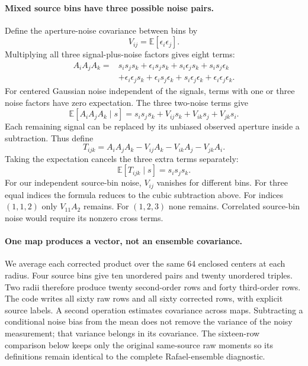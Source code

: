 \documentclass[11pt]{article}
\newcommand{\E}{\mathbb E}
\begin{document}
\paragraph{Mixed source bins have three possible noise pairs.}
Define the aperture-noise covariance between bins by
\begin{equation}
 V_{ij}=\E[\epsilon_i\epsilon_j].
\end{equation}
Multiplying all three signal-plus-noise factors gives eight terms:
\begin{align}
 A_iA_jA_k={}&s_is_js_k
 +\epsilon_i s_js_k+s_i\epsilon_j s_k+s_is_j\epsilon_k\nonumber\\
 &+\epsilon_i\epsilon_j s_k
  +\epsilon_i s_j\epsilon_k
  +s_i\epsilon_j\epsilon_k
  +\epsilon_i\epsilon_j\epsilon_k.
\end{align}
For centered Gaussian noise independent of the signals, terms with one or
three noise factors have zero expectation. The three two-noise terms give
\begin{equation}
 \E[A_iA_jA_k\mid s]=s_is_js_k+V_{ij}s_k+V_{ik}s_j+V_{jk}s_i.
\end{equation}
Each remaining signal can be replaced by its unbiased observed aperture
inside a subtraction. Thus define
\begin{equation}
 T_{ijk}=A_iA_jA_k-V_{ij}A_k-V_{ik}A_j-V_{jk}A_i.
\end{equation}
Taking the expectation cancels the three extra terms separately:
\begin{equation}
 \E[T_{ijk}\mid s]=s_is_js_k.
\end{equation}
For our independent source-bin noise, $V_{ij}$ vanishes for different bins.
For three equal indices the formula reduces to the cubic subtraction above.
For indices $(1,1,2)$ only $V_{11}A_2$ remains. For $(1,2,3)$ none remains.
Correlated source-bin noise would require its nonzero cross terms.

\paragraph{One map produces a vector, not an ensemble covariance.}
We average each corrected product over the same 64 enclosed centers at each
radius. Four source bins give ten unordered pairs and twenty unordered
triples. Two radii therefore produce twenty second-order rows and forty
third-order rows. The code writes all sixty raw rows and all sixty corrected
rows, with explicit source labels. A second operation estimates covariance
across maps. Subtracting a conditional noise bias from the mean does not
remove the variance of the noisy measurement; that variance belongs in its
covariance. The sixteen-row comparison below keeps only the original
same-source raw moments so its definitions remain identical to the complete
Rafael-ensemble diagnostic.
\end{document}
